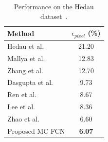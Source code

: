 \begin{table}
	\centering 
	\begin{tabular}{lc}
		\toprule
		Method & $\epsilon_{pixel}$ (\%) \\
		\midrule
		Hedau et al.~\cite{hedau2009recovering} & 21.20 \\
		Mallya et al.~\cite{mallya2015learning} & 12.83 \\
		Zhang et al.~\cite{zhang2017learning} & 12.70 \\
		Dasgupta et al.~\cite{dasgupta2016delay} & 9.73 \\
		Ren et al.~\cite{ren2016coarse} & 8.67 \\
		Lee et al.~\cite{LeeRoomNet17} & 8.36 \\
		Zhao et al.~\cite{zhao2017physics} & 6.60 \\
		\midrule
		Proposed MC-FCN & \textbf{6.07} \\
		\bottomrule
	\end{tabular}
	\caption{Performance on the Hedau dataset~\cite{hedau2009recovering}. }
	\label{table:comparison-hedau}
\end{table}



